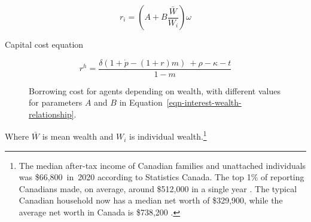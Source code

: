 \begin{equation}
r_i = (A + B \frac{\bar{W}}{W_i})\omega \label{eqn-interest-wealth-relationship}
\end{equation}
 

 Capital cost equation
 
\[   r^h=\frac{ \delta(1+\dot p  - (1+r)m) \ + \rho   	-\kappa - t } {1-m}    \]

\begin{figure}[!hb]
\begin{center}
\caption[Borrowing cost for agents depending on wealth.]{Borrowing cost for agents depending on wealth, with different values for parameters $A$ and $B$ in Equation~\ref{eqn-interest-wealth-relationship}.} %
\label{fig-capital-cost}
\end{center}
\end{figure}

Where $\bar{W}$ is mean wealth and $W_i$ is individual wealth.\footnote{The median after-tax income of Canadian families and unattached individuals was \$66,800 in 2020 according to Statistics Canada.%
 The top 1\% of reporting Canadians made, on average, around \$512,000 in a single year \cite{WEB_model-stats-can-canadian-incomes}. %
 The typical Canadian household now has a median net worth of \$329,900, while the average net worth in Canada is \$738,200 \cite{WEB-model-stats-can-median-net-worth}.  %
} 










